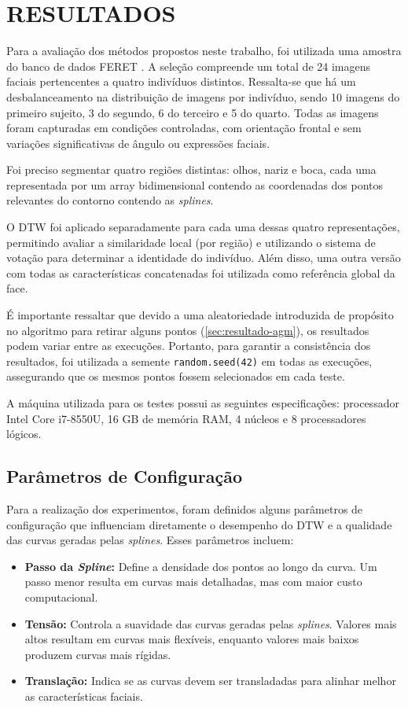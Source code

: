 \chapter{RESULTADOS} \label{cha:resultados}

Para a avaliação dos métodos propostos neste trabalho, foi utilizada uma amostra do banco de dados FERET \cite{FERET1,FERET2}. A seleção compreende um total de 24 imagens faciais pertencentes a quatro indivíduos distintos. Ressalta-se que há um desbalanceamento na distribuição de imagens por indivíduo, sendo 10 imagens do primeiro sujeito, 3 do segundo, 6 do terceiro e 5 do quarto. Todas as imagens foram capturadas em condições controladas, com orientação frontal e sem variações significativas de ângulo ou expressões faciais.

Foi preciso segmentar quatro regiões distintas: olhos, nariz e boca, cada uma representada por um array bidimensional contendo as coordenadas dos pontos relevantes do contorno contendo as \textit{splines}.

O DTW foi aplicado separadamente para cada uma dessas quatro representações, permitindo avaliar a similaridade local (por região) e utilizando o sistema de votação para determinar a identidade do indivíduo. Além disso, uma outra versão com todas as características concatenadas foi utilizada como referência global da face.

É importante ressaltar que devido a uma aleatoriedade introduzida de propósito no algoritmo para retirar alguns pontos (\autoref{sec:resultado-agm}), os resultados podem variar entre as execuções. Portanto, para garantir a consistência dos resultados, foi utilizada a semente \texttt{random.seed(42)} em todas as execuções, assegurando que os mesmos pontos fossem selecionados em cada teste.

A máquina utilizada para os testes possui as seguintes especificações: processador Intel Core i7-8550U, 16 GB de memória RAM, 4 núcleos e 8 processadores lógicos.

\section{Parâmetros de Configuração}
\label{sec:parametros-configuracao}

Para a realização dos experimentos, foram definidos alguns parâmetros de configuração que influenciam diretamente o desempenho do DTW e a qualidade das curvas geradas pelas \textit{splines}. Esses parâmetros incluem:
\begin{itemize}
    \item \textbf{Passo da \textit{Spline}:} Define a densidade dos pontos ao longo da curva. Um passo menor resulta em curvas mais detalhadas, mas com maior custo computacional.
    \item \textbf{Tensão:} Controla a suavidade das curvas geradas pelas \textit{splines}. Valores mais altos resultam em curvas mais flexíveis, enquanto valores mais baixos produzem curvas mais rígidas.
    \item \textbf{Translação:} Indica se as curvas devem ser transladadas para alinhar melhor as características faciais.
\end{itemize}

